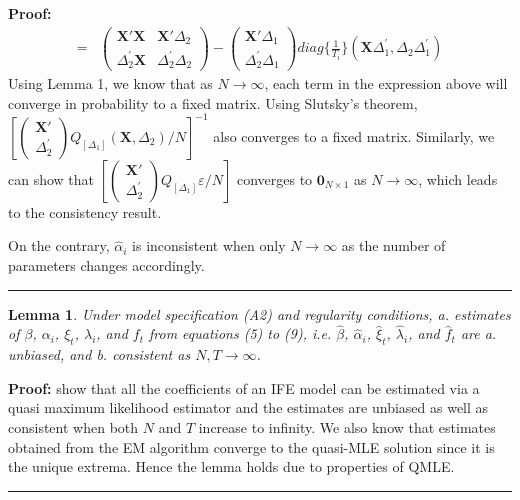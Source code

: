 \documentclass[12pt]{article}
\newtheorem{lemma}{Lemma}
\newenvironment{proof}[1][Proof]{\noindent\textbf{#1:} }{\  \rule{0.5em}{0.5em}}
\begin{document}
\begin{proof}
\begin{align*}
= & \begin{pmatrix}
\mathbf{X}'\mathbf{X} & \mathbf{X}'\Delta_{2} \\
\Delta_{2}^{'}\mathbf{X} & \Delta_{2}^{'}\Delta_{2}
\end{pmatrix} - 
\begin{pmatrix}
\mathbf{X}'\Delta_{1} \\
\Delta_{2}^{'}\Delta_{1}
\end{pmatrix} diag\{\frac{1}{T_i}\} (\mathbf{X}\Delta_{1}^{'}, \Delta_{2}\Delta_{1}^{'})
\end{align*}
Using Lemma 1, we know that as $N \rightarrow \infty$, each term in the expression above will converge in probability to a fixed matrix. Using Slutsky's theorem,  $\left[\begin{pmatrix}
\mathbf{X}'\\
\Delta_{2}^{'}
\end{pmatrix} Q_{[\Delta_1]} (\mathbf{X}, \Delta_{2}) / N\right]^{-1}$ also converges to a fixed matrix. Similarly, we can show that $\left[\begin{pmatrix}
\mathbf{X}'\\
\Delta_{2}^{'}
\end{pmatrix} Q_{[\Delta_1]} \varepsilon / N \right]$ converges to $\mathbf{0}_{N \times 1}$ as $N \rightarrow \infty$, which leads to the consistency result.

On the contrary, $\hat{\alpha}_i$ is inconsistent when only $N \rightarrow \infty$ as the number of parameters changes accordingly.
\end{proof}

\begin{lemma}
Under model specification (A2) and regularity conditions, a. estimates of $\beta$, $\alpha_{i}$, $\xi_{t}$, $\lambda_{i}$, and $f_{t}$ from equations (5) to (9), i.e. $\hat{\beta}$, $\hat{\alpha}_{i}$, $\hat{\xi}_{t}$, $\hat{\lambda}_{i}$, and $\hat{f}_{t}$ are a. unbiased, and b. consistent as $N, T  \rightarrow \infty$.
\end{lemma}

\begin{proof}
\citet{MoonWeidner2013} show that all the coefficients of an IFE model can be estimated via a quasi maximum likelihood estimator and the estimates are unbiased as well as consistent when both $N$ and $T$ increase to infinity. We also know that estimates obtained from the EM algorithm converge to the quasi-MLE solution since it is the unique extrema. Hence the lemma holds due to properties of QMLE.
\end{proof}
\end{document}
